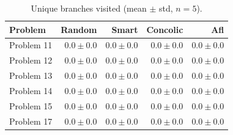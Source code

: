 \begin{table}[h]
    \centering
    \caption{Unique branches visited (mean $\pm$ std, $n=5$).}
    \label{tab:task2-branches}
    \begin{tabular}{lrrrr}
        \toprule
        Problem & \textbf{Random} & \textbf{Smart} & \textbf{Concolic} & \textbf{Afl} \\
        \midrule
        Problem 11 & $0.0 \pm 0.0$ & $0.0 \pm 0.0$ & $0.0 \pm 0.0$ & $0.0 \pm 0.0$ \\
        Problem 12 & $0.0 \pm 0.0$ & $0.0 \pm 0.0$ & $0.0 \pm 0.0$ & $0.0 \pm 0.0$ \\
        Problem 13 & $0.0 \pm 0.0$ & $0.0 \pm 0.0$ & $0.0 \pm 0.0$ & $0.0 \pm 0.0$ \\
        Problem 14 & $0.0 \pm 0.0$ & $0.0 \pm 0.0$ & $0.0 \pm 0.0$ & $0.0 \pm 0.0$ \\
        Problem 15 & $0.0 \pm 0.0$ & $0.0 \pm 0.0$ & $0.0 \pm 0.0$ & $0.0 \pm 0.0$ \\
        Problem 17 & $0.0 \pm 0.0$ & $0.0 \pm 0.0$ & $0.0 \pm 0.0$ & $0.0 \pm 0.0$ \\
        \bottomrule
    \end{tabular}
\end{table}